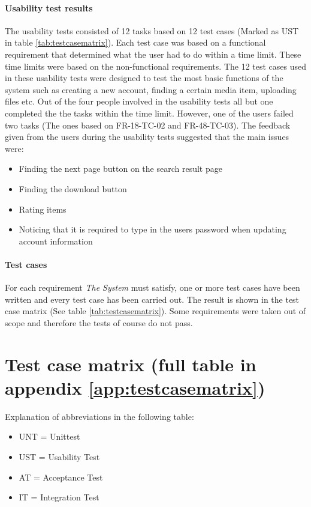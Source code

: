 \documentclass[../report.tex]{subfiles}
\begin{document}
\paragraph{Usability test results}
The usability tests consisted of 12 tasks based on 12 test cases (Marked as UST in table \ref{tab:testcasematrix}). Each test case was based on a functional requirement that determined what the user had to do within a time limit. These time limits were based on the non-functional requirements. The 12 test cases used in these usability tests were designed to test the most basic functions of the system such as creating a new account, finding a certain media item, uploading files etc. 
Out of the four people involved in the usability tests all but one completed the the tasks within the time limit. However, one of the users failed two tasks (The ones based on FR-18-TC-02 and FR-48-TC-03). The feedback given from the users during the usability tests suggested that the main issues were:
\begin{itemize}
\item Finding the next page button on the search result page
\item Finding the download button
\item Rating items
\item Noticing that it is required to type in the users password when updating account information
\end{itemize} 

\paragraph{Test cases}
For each requirement \textit{The System} must satisfy, one or more test cases have been written and every test case has been carried out. The result is shown in the test case matrix (See table \ref{tab:testcasematrix}). Some requirements were taken out of scope and therefore the tests of course do not pass.

\newpage
\section{Test case matrix (full table in appendix \ref{app:testcasematrix})}

Explanation of abbreviations in the following table:
\begin{itemize}
\item UNT = Unittest
\item UST = Usability Test
\item AT = Acceptance Test
\item IT = Integration Test
\end{itemize}
\end{document}
